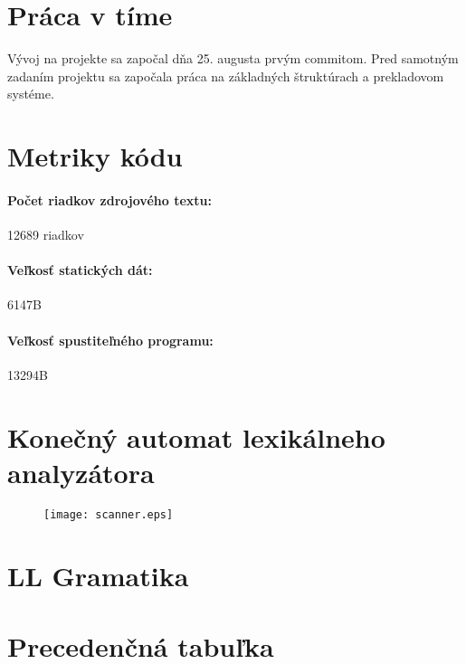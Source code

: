 \documentclass[12pt,a4paper,titlepage,final]{article}
\begin{document}
\section{Práca v tíme}
Vývoj na projekte sa započal dňa 25. augusta prvým commitom. Pred samotným
zadaním projektu sa započala práca na základných štruktúrach a prekladovom
systéme.


\appendix

\section{Metriky kódu} \label{metriky}
\paragraph{Počet riadkov zdrojového textu:} 12689 riadkov
\paragraph{Veľkosť statických dát:} 6147B
\paragraph{Veľkosť spustiteľného programu:} 13294B

\section{Konečný automat lexikálneho analyzátora}

\begin{figure}[H]
\begin{center}
	\texttt{[image: scanner.eps]}
	\label{fig:scanner}
\end{center}
\end{figure}

%
\section{LL Gramatika} \label{gramatika}



%
\section{Precedenčná tabuľka} \label{precedencna_tabulka}



\end{document}
